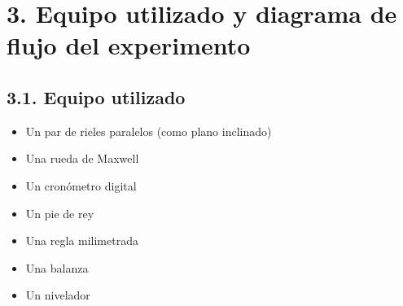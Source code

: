 \documentclass[10pt]{article}
\begin{document}
\section*{3. Equipo utilizado y diagrama de flujo del experimento}
\subsection*{3.1. Equipo utilizado}
\begin{itemize}
  \item Un par de rieles paralelos (como plano inclinado)
  \item Una rueda de Maxwell
  \item Un cronómetro digital
  \item Un pie de rey
  \item Una regla milimetrada
  \item Una balanza
  \item Un nivelador
\end{itemize}
\end{document}
